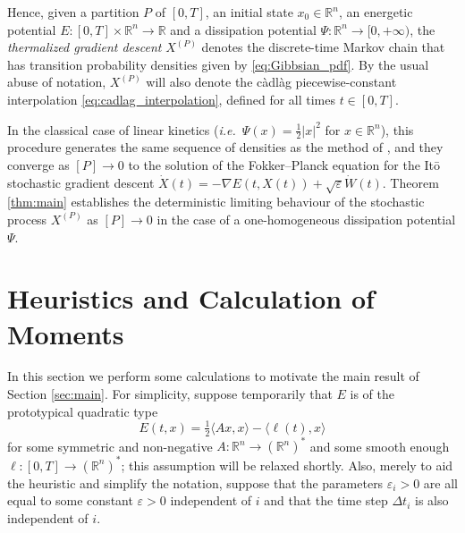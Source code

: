 \documentclass[reqno]{amsart}
\theoremstyle{definition}
\begin{document}
Hence, given a partition $P$ of $[0, T]$, an initial state $x_{0} \in {\mathbb{R}}^{n}$, an energetic potential $E \colon [0, T] \times {\mathbb{R}}^{n} \to {\mathbb{R}}$ and a dissipation potential $\Psi \colon {\mathbb{R}}^{n} \to [0, +\infty)$, the \emph{thermalized gradient descent} $X^{(P)}$ denotes the discrete-time Markov chain that has transition probability densities given by \eqref{eq:Gibbsian_pdf}.  By the usual abuse of notation, $X^{(P)}$ will also denote the c{\`a}dl{\`a}g piecewise-constant interpolation \eqref{eq:cadlag_interpolation}, defined for all times $t \in [0, T]$.

In the classical case of linear kinetics (\emph{i.e.}\ $\Psi(x) = \frac{1}{2} | x |^{2}$ for $x \in {\mathbb{R}}^{n}$), this procedure generates the same sequence of densities as the method of \cite{JordanKinderlehrerOtto:1998}, and they converge as $[P] \to 0$ to the solution of the Fokker--Planck equation for the It{\=o} stochastic gradient descent $\dot{X}(t) = - \nabla E(t, X(t)) + \sqrt{\varepsilon} \dot{W}(t)$.  Theorem \ref{thm:main} establishes the deterministic limiting behaviour of the stochastic process $X^{(P)}$ as $[P] \to 0$ in the case of a one-homogeneous dissipation potential $\Psi$.

\section{Heuristics and Calculation of Moments}
\label{sec:heuristics}

In this section we perform some calculations to motivate the main result of Section \ref{sec:main}.  For simplicity, suppose temporarily that $E$ is of the prototypical quadratic type
\[
	E(t, x) = \tfrac{1}{2} \langle A x, x \rangle - \langle \ell(t), x \rangle
\]
for some symmetric and non-negative $A \colon {\mathbb{R}}^{n} \to ({\mathbb{R}}^{n})^{\ast}$ and some smooth enough $\ell \colon [0, T] \to ({\mathbb{R}}^{n})^{\ast}$;  this assumption will be relaxed shortly.  Also, merely to aid the heuristic and simplify the notation, suppose that the parameters ${\varepsilon}_{i} > 0$ are all equal to some constant ${\varepsilon} > 0$ independent of $i$ and that the time step $\Delta t_{i}$ is also independent of $i$.
 
\end{document}
